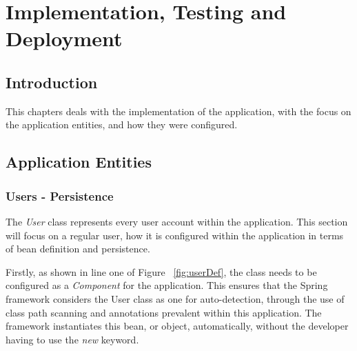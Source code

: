 \chapter{Implementation, Testing and Deployment}
\label{impltesting}

\label{sec:impl}
\section{Introduction}

This chapters deals with the implementation of the application, with the focus on the application entities, and how they were configured.

\section{Application Entities}
\subsection{Users - Persistence}

The \textit{User} class represents every user account within the application. This section will focus on a regular user, how it is configured within the application in terms of bean definition and persistence. 

Firstly, as shown in line one of Figure ~\ref{fig:userDef}, the class needs to be configured as a \textit{Component} for the application. This ensures that the Spring framework considers the User class as one for auto-detection, through the use of class path scanning and annotations prevalent within this application. The framework instantiates this bean, or object, automatically, without the developer having to use the \textit{new} keyword.


